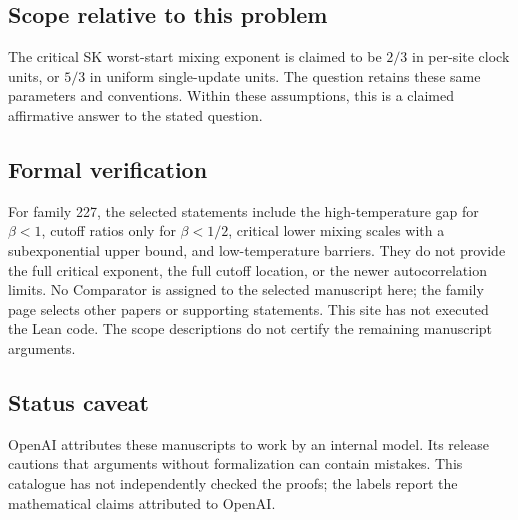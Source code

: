 \documentclass[11pt]{article}
\begin{document}
\subsection{Scope relative to this problem}
The critical SK worst-start mixing exponent is claimed to be $2/3$ in per-site clock units, or $5/3$ in uniform single-update units. The question retains these same parameters and conventions. Within these assumptions, this is a claimed affirmative answer to the stated question.

\subsection{Formal verification}
For family 227, the selected statements include the high-temperature gap for $\beta<1$, cutoff ratios only for $\beta<1/2$, critical lower mixing scales with a subexponential upper bound, and low-temperature barriers. They do not provide the full critical exponent, the full cutoff location, or the newer autocorrelation limits. No Comparator is assigned to the selected manuscript here; the family page selects other papers or supporting statements. This site has not executed the Lean code. The scope descriptions do not certify the remaining manuscript arguments.

\subsection{Status caveat}
OpenAI attributes these manuscripts to work by an internal model. Its release cautions that arguments without formalization can contain mistakes. This catalogue has not independently checked the proofs; the labels report the mathematical claims attributed to OpenAI.
\end{document}
